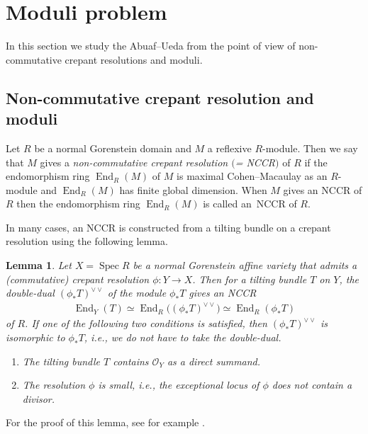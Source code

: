 \documentclass[pdftex]{sigma}
\DeclareMathOperator{\End}{End}
\DeclareMathOperator{\Spec}{Spec}
\newcommand{\stsh}{\mathcal{O}}
\numberwithin{equation}{section}
\newtheorem{Lemma}[Theorem]{Lemma}
\begin{document}
\section{Moduli problem}

In this section we study the Abuaf--Ueda from the point of view of non-commutative crepant resolutions and moduli.

\subsection{Non-commutative crepant resolution and moduli}

\begin{Definition}
Let $R$ be a normal Gorenstein domain and $M$ a reflexive $R$-module.
Then we say that $M$ gives a \textit{non-commutative crepant resolution $($= NCCR$)$} of $R$
if the endomorphism ring $\End_R(M)$ of $M$ is maximal Cohen--Macaulay as an $R$-module and
$\End_R(M)$ has finite global dimension.
When $M$ gives an NCCR of $R$ then the endomorphism ring $\End_R(M)$ is called an~NCCR of $R$.
\end{Definition}

In many cases, an NCCR is constructed from a tilting bundle on a crepant resolution
using the following lemma.

\begin{Lemma}
Let $X = \Spec R$ be a normal Gorenstein affine variety that admits a (commutative) crepant resolution $\phi\colon Y \to X$.
Then for a tilting bundle $T$ on $Y$,
the double-dual $(\phi_* T)^{\vee \vee}$ of the module $\phi_* T$ gives an NCCR
\begin{gather*}
\End_Y(T) \simeq \End_R\big((\phi_* T)^{\vee\vee}\big) \simeq \End_R(\phi_* T)
\end{gather*}
 of $R$.
If one of the following two conditions is satisfied, then $(\phi_* T)^{\vee \vee}$ is isomorphic to $\phi_* T$,
i.e., we do not have to take the double-dual.
\begin{enumerate}\itemsep=0pt
\item[$(a)$] The tilting bundle $T$ contains $\stsh_Y$ as a direct summand.
\item[$(b)$] The resolution $\phi$ is small, i.e., the exceptional locus of $\phi$ does not contain a divisor.
\end{enumerate}
\end{Lemma}

For the proof of this lemma, see for example \cite[Section 2]{H17c}.
\end{document}

